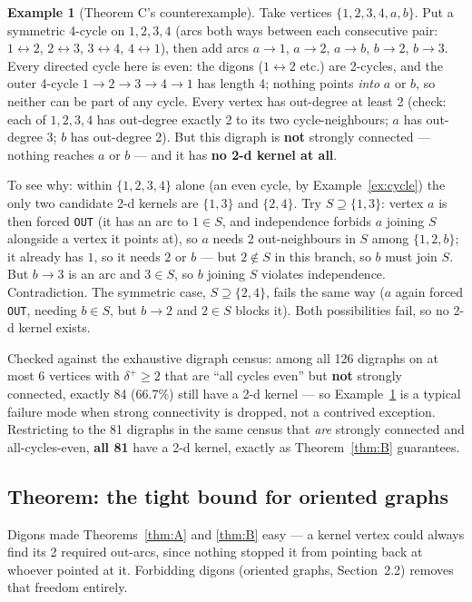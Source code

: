 \documentclass[11pt]{article}
\theoremstyle{plain}
\theoremstyle{definition}
\newtheorem{example}[theorem]{Example}
\theoremstyle{remark}
\begin{document}
\begin{example}[Theorem C's counterexample]
\label{ex:C}
Take vertices $\{1,2,3,4,a,b\}$. Put a symmetric 4-cycle on $1,2,3,4$ (arcs both ways
between each consecutive pair: $1\leftrightarrow2$, $2\leftrightarrow3$,
$3\leftrightarrow4$, $4\leftrightarrow1$), then add arcs $a\to1$, $a\to2$, $a\to b$,
$b\to2$, $b\to3$. Every directed cycle here is even: the digons ($1\leftrightarrow2$
etc.) are 2-cycles, and the outer 4-cycle $1\to2\to3\to4\to1$ has length 4; nothing
points \emph{into} $a$ or $b$, so neither can be part of any cycle. Every vertex has
out-degree at least 2 (check: each of $1,2,3,4$ has out-degree exactly 2 to its two
cycle-neighbours; $a$ has out-degree 3; $b$ has out-degree 2). But this digraph is
\textbf{not} strongly connected — nothing reaches $a$ or $b$ — and it has \textbf{no
2-d kernel at all}.

To see why: within $\{1,2,3,4\}$ alone (an even cycle, by Example~\ref{ex:cycle}) the
only two candidate 2-d kernels are $\{1,3\}$ and $\{2,4\}$.
Try $S \supseteq \{1,3\}$: vertex $a$ is then forced \texttt{OUT} (it has an arc to
$1 \in S$, and independence forbids $a$ joining $S$ alongside a vertex it points at),
so $a$ needs 2 out-neighbours in $S$ among $\{1,2,b\}$; it already has $1$, so it needs
$2$ or $b$ — but $2 \notin S$ in this branch, so $b$ must join $S$. But $b \to 3$ is an
arc and $3 \in S$, so $b$ joining $S$ violates independence. Contradiction. The
symmetric case, $S \supseteq \{2,4\}$, fails the same way ($a$ again forced
\texttt{OUT}, needing $b \in S$, but $b \to 2$ and $2 \in S$ blocks it). Both
possibilities fail, so no 2-d kernel exists.
\end{example}

Checked against the exhaustive digraph census: among all 126 digraphs on at most 6
vertices with $\delta^+ \ge 2$ that are ``all cycles even'' but \textbf{not} strongly
connected, exactly 84 (66.7\%) still have a 2-d kernel — so Example~\ref{ex:C} is a
typical failure mode when strong connectivity is dropped, not a contrived exception.
Restricting to the 81 digraphs in the same census that \emph{are} strongly connected
and all-cycles-even, \textbf{all 81} have a 2-d kernel, exactly as Theorem~\ref{thm:B}
guarantees.

\subsection{Theorem: the tight bound for oriented graphs}

Digons made Theorems~\ref{thm:A} and \ref{thm:B} easy — a kernel vertex could always
find its 2 required out-arcs, since nothing stopped it from pointing back at whoever
pointed at it. Forbidding digons (oriented graphs, Section~2.2) removes that freedom
entirely.
\end{document}
